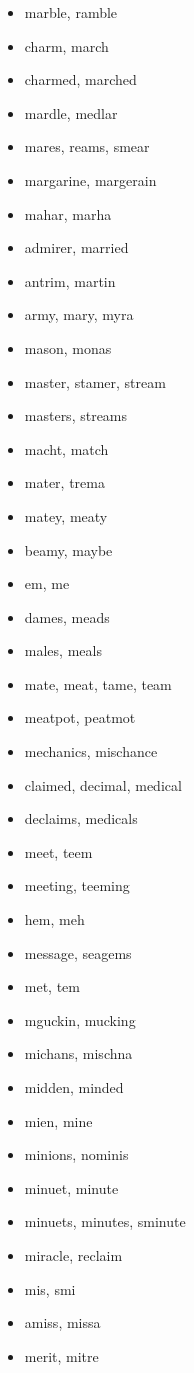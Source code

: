 \documentclass[a4wide,11pt]{report}
\begin{document}
\begin{itemize}
  \item marble, ramble
  \item charm, march
  \item charmed, marched
  \item mardle, medlar
  \item mares, reams, smear
  \item margarine, margerain
  \item mahar, marha
  \item admirer, married
  \item antrim, martin
  \item army, mary, myra
  \item mason, monas
  \item master, stamer, stream
  \item masters, streams
  \item macht, match
  \item mater, trema
  \item matey, meaty
  \item beamy, maybe
  \item em, me
  \item dames, meads
  \item males, meals
  \item mate, meat, tame, team
  \item meatpot, peatmot
  \item mechanics, mischance
  \item claimed, decimal, medical
  \item declaims, medicals
  \item meet, teem
  \item meeting, teeming
  \item hem, meh
  \item message, seagems
  \item met, tem
  \item mguckin, mucking
  \item michans, mischna
  \item midden, minded
  \item mien, mine
  \item minions, nominis
  \item minuet, minute
  \item minuets, minutes, sminute
  \item miracle, reclaim
  \item mis, smi
  \item amiss, missa
  \item merit, mitre

\end{itemize}
\end{document}
